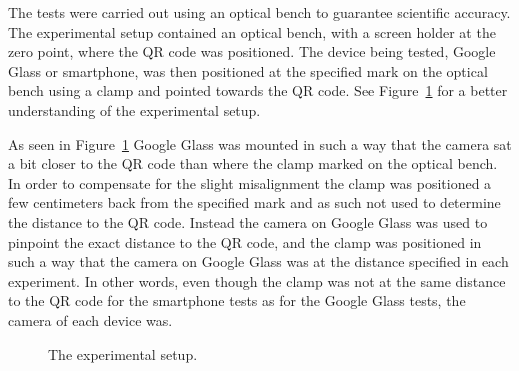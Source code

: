 %
The tests were carried out using an optical bench to guarantee scientific accuracy. The experimental setup contained an optical bench, with a screen holder at the zero point, where the QR code was positioned. The device being tested, Google Glass or smartphone, was then positioned at the specified mark on the optical bench using a clamp and pointed towards the QR code. See Figure~\ref{experimentalSetup} for a better understanding of the experimental setup. 

As seen in Figure~\ref{experimentalSetup} Google Glass was mounted in such a way that the camera sat a bit closer to the QR code than where the clamp marked on the optical bench. In order to compensate for the slight misalignment the clamp was positioned a few centimeters back from the specified mark and as such not used to determine the distance to the QR code. Instead the camera on Google Glass was used to pinpoint the exact distance to the QR code, and the clamp was positioned in such a way that the camera on Google Glass was at the distance specified in each experiment. In other words, even though the clamp was not at the same distance to the QR code for the smartphone tests as for the Google Glass tests, the camera of each device was.

	\begin{figure}[H]%
		\centering
   		 \qquad
   		 \qquad
		\caption{The experimental setup.}
		\label{experimentalSetup}
	\end{figure}

